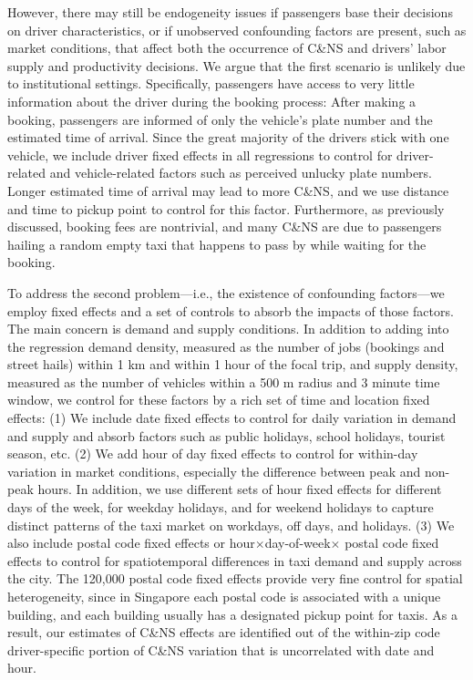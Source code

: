 \documentclass[reviewmode,AEJ]{AEA}
\begin{document}
However, there may still be endogeneity issues if passengers base their decisions 
on driver characteristics, or if unobserved confounding factors are present, such as market conditions,
that affect both the occurrence of C\&NS and drivers' labor supply and productivity decisions. 
We argue that the first scenario is unlikely due to institutional settings. Specifically, passengers have 
access to very little information about the driver during the booking process: After making a booking, 
passengers are informed of only the vehicle's plate number and the estimated time of arrival. 
Since the great majority of the drivers stick with one vehicle, we include driver fixed effects in all
regressions to control for driver-related and vehicle-related factors such as perceived unlucky plate numbers.
Longer estimated time of arrival may lead to more C\&NS, and we use distance and time to pickup point to 
control for this factor. 
Furthermore, as previously discussed, booking fees are nontrivial, and many C\&NS are due to passengers
hailing a random empty taxi that happens to pass by while waiting for the booking. 

To address the second problem---i.e., the existence of confounding factors---we employ fixed effects and a
set of controls to absorb the impacts of those factors. The main concern is demand and supply conditions.
In addition to adding  into the regression demand density, measured as the number of jobs (bookings and street 
hails) within 1 km and within 1 hour of the focal trip, and supply density, measured as the number of vehicles
within a 500 m radius and 3 minute time window, we control for these factors by a rich set of time and
location fixed effects: (1) We include date fixed effects to control for daily variation in demand and 
supply and absorb factors such as public holidays, school holidays, tourist season, etc. (2) We add hour 
of day fixed effects to control for within-day variation in market conditions, especially the difference 
between peak and non-peak hours. In addition, we use different sets of hour fixed effects for different days 
of the week, for weekday holidays, and for weekend holidays to capture distinct patterns of the taxi market on 
workdays, off days, and holidays. 
(3)  We also include postal code fixed effects or hour\(\times\)day-of-week\(\times\) postal code fixed effects to control 
for spatiotemporal differences in taxi demand and supply across the city.
The 120,000 postal code fixed effects provide very fine control for spatial 
heterogeneity, since in Singapore each postal code is associated with a unique building, and each building
usually has a designated pickup point for taxis. As a result, our estimates of C\&NS effects are identified 
out of the within-zip code driver-specific portion of C\&NS variation that is uncorrelated with date and hour. 
\end{document}
